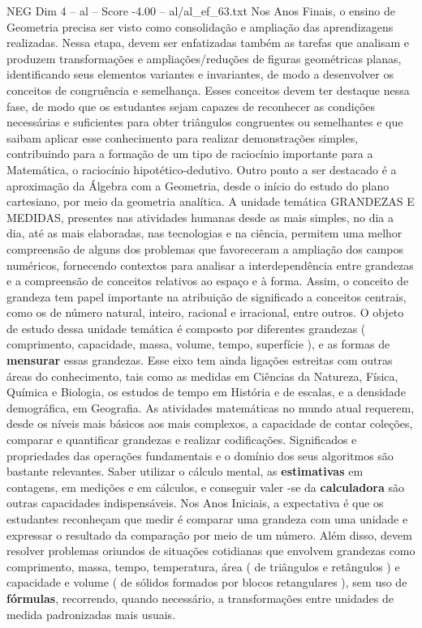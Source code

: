 \begin{textsample}{NEG Dim 4 – al – Score -4.00 – al/al\_ef\_63.txt}
Nos Anos Finais, o ensino de Geometria precisa ser visto como consolidação e ampliação das aprendizagens realizadas.
Nessa etapa, devem ser enfatizadas também as tarefas que analisam e produzem transformações e ampliações/reduções de figuras geométricas planas, identificando seus elementos variantes e invariantes, de modo a desenvolver os conceitos de congruência e semelhança.
Esses conceitos devem ter destaque nessa fase, de modo que os estudantes sejam capazes de reconhecer as condições necessárias e suficientes para obter triângulos congruentes ou semelhantes e que saibam aplicar esse conhecimento para realizar demonstrações simples, contribuindo para a formação de um tipo de raciocínio importante para a Matemática, o raciocínio hipotético-dedutivo.
Outro ponto a ser destacado é a aproximação da Álgebra com a Geometria, desde o início do estudo do plano cartesiano, por meio da geometria analítica.
A unidade temática GRANDEZAS E MEDIDAS, presentes nas atividades humanas desde as mais simples, no dia a dia, até as mais elaboradas, nas tecnologias e na ciência, permitem uma melhor compreensão de alguns dos problemas que favoreceram a ampliação dos campos numéricos, fornecendo contextos para analisar a interdependência entre grandezas e a compreensão de conceitos relativos ao espaço e à forma.
Assim, o conceito de grandeza tem papel importante na atribuição de significado a conceitos centrais, como os de número natural, inteiro, racional e irracional, entre outros.
O objeto de estudo dessa unidade temática é composto por diferentes grandezas ( comprimento, capacidade, massa, volume, tempo, superfície ), e as formas de \textbf{mensurar} essas grandezas.
Esse eixo tem ainda ligações estreitas com outras áreas do conhecimento, tais como as medidas em Ciências da Natureza, Física, Química e Biologia, os estudos de tempo em História e de escalas, e a densidade demográfica, em Geografia.
As atividades matemáticas no mundo atual requerem, desde os níveis mais básicos aos mais complexos, a capacidade de contar coleções, comparar e quantificar grandezas e realizar codificações.
Significados e propriedades das operações fundamentais e o domínio dos seus algoritmos são bastante relevantes.
Saber utilizar o cálculo mental, as \textbf{estimativas} em contagens, em medições e em cálculos, e conseguir valer -se da \textbf{calculadora} são outras capacidades indispensáveis.
Nos Anos Iniciais, a expectativa é que os estudantes reconheçam que medir é comparar uma grandeza com uma unidade e expressar o resultado da comparação por meio de um número.
Além disso, devem resolver problemas oriundos de situações cotidianas que envolvem grandezas como comprimento, massa, tempo, temperatura, área ( de triângulos e retângulos ) e capacidade e volume ( de sólidos formados por blocos retangulares ), sem uso de \textbf{fórmulas}, recorrendo, quando necessário, a transformações entre unidades de medida padronizadas mais usuais.

\end{textsample}
